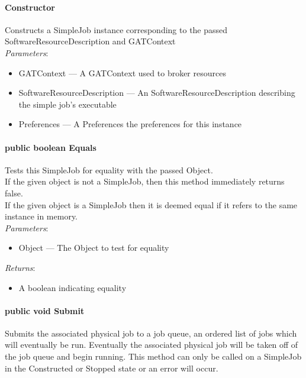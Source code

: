 \documentclass[$Date: 2003/06/26 19:29:31 $]{glabarticle}
\begin{document}
\paragraph{Constructor}

Constructs a SimpleJob instance corresponding to the passed
SoftwareResourceDescription and GATContext\\

\textit{Parameters}:
\begin{itemize}
\item[] GATContext --- A GATContext used to broker resources
\item[] SoftwareResourceDescription --- An SoftwareResourceDescription describing the simple job's executable
\item[] Preferences --- A Preferences the preferences for this instance
\end{itemize}

\paragraph{public boolean Equals}

 Tests this SimpleJob for equality with the passed Object. \\

 If the given object is not a SimpleJob, then this method immediately  returns false. \\
 
 If the given object is a SimpleJob then it is deemed equal if it refers to the same instance in memory. \\

 \textit{Parameters}:
 \begin{itemize}
 \item[] Object --- The Object to test for equality 
 \end{itemize}
 
 \textit{Returns}:
\begin{itemize}
\item[] A boolean indicating equality
\end{itemize}

\paragraph{public void Submit}

Submits the associated physical job to a job queue, an ordered list of
jobs which will eventually be run. Eventually the associated physical
job will be taken off of the job queue and begin running. This method
can only be called on a SimpleJob in the Constructed or Stopped state or 
an error will occur. \\
\end{document}

